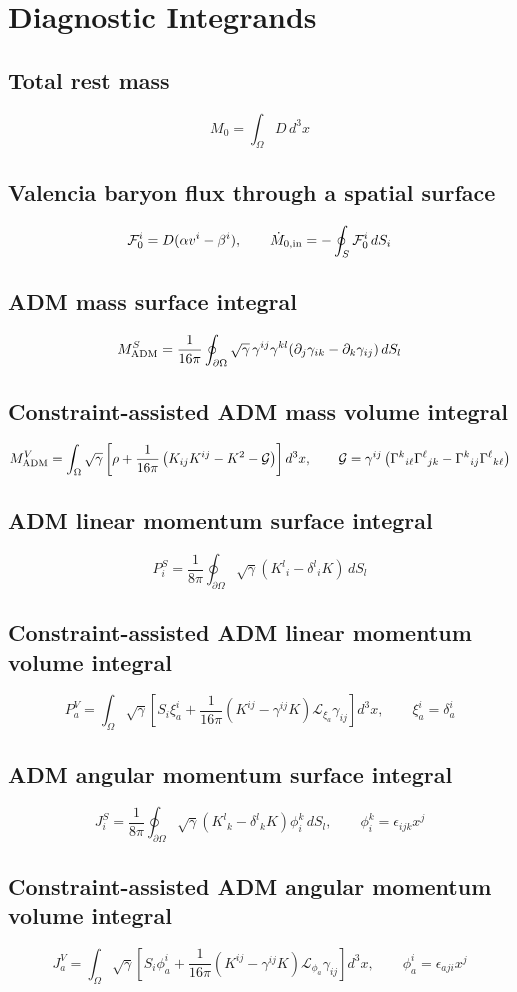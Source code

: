 \documentclass[11pt]{article}
\begin{document}
\section{Diagnostic Integrands}
\subsection*{Total rest mass}
\[
M_0 = \int_\Omega D\,d^3x
\]
\subsection*{Valencia baryon flux through a spatial surface}
\[
\mathcal F_0^i=D(\alpha v^i-\beta^i),\qquad\dot M_{0,\rm in}=-\oint_S\mathcal F_0^i\,dS_i
\]
\subsection*{ADM mass surface integral}
\[
M_{\rm ADM}^{S}=\frac{1}{16\pi}\oint_{\partial\Omega}\sqrt{\gamma}\,\gamma^{ij}\gamma^{kl}(\partial_j\gamma_{ik}-\partial_k\gamma_{ij})\,dS_l
\]
\subsection*{Constraint-assisted ADM mass volume integral}
\[
M_{\rm ADM}^{V}=\int_\Omega\sqrt{\gamma}\left[\rho+\frac{1}{16\pi}\left(K_{ij}K^{ij}-K^2-\mathcal G\right)\right]d^3x,\qquad\mathcal G=\gamma^{ij}\left(\Gamma^k{}_{i\ell}\Gamma^\ell{}_{jk}-\Gamma^k{}_{ij}\Gamma^\ell{}_{k\ell}\right)
\]
\subsection*{ADM linear momentum surface integral}
\[
P_i^{S}=\frac{1}{8\pi}\oint_{\partial\Omega}\sqrt{\gamma}(K^l{}_i-\delta^l{}_iK)\,dS_l
\]
\subsection*{Constraint-assisted ADM linear momentum volume integral}
\[
P_a^{V}=\int_\Omega\sqrt{\gamma}\left[S_i\xi_a^i+\frac{1}{16\pi}(K^{ij}-\gamma^{ij}K)\mathcal L_{\xi_a}\gamma_{ij}\right]d^3x,\qquad \xi_a^i=\delta_a^i
\]
\subsection*{ADM angular momentum surface integral}
\[
J_i^{S}=\frac{1}{8\pi}\oint_{\partial\Omega}\sqrt{\gamma}(K^l{}_k-\delta^l{}_kK)\phi_i^k\,dS_l,\qquad\phi_i^k=\epsilon_{ijk}x^j
\]
\subsection*{Constraint-assisted ADM angular momentum volume integral}
\[
J_a^{V}=\int_\Omega\sqrt{\gamma}\left[S_i\phi_a^i+\frac{1}{16\pi}(K^{ij}-\gamma^{ij}K)\mathcal L_{\phi_a}\gamma_{ij}\right]d^3x,\qquad \phi_a^i=\epsilon_{aji}x^j
\]
\end{document}
